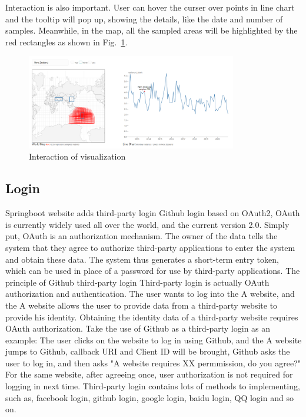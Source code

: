 \documentclass[conference]{IEEEtran}
\begin{document}
Interaction is also important. User can hover the curser over points in line chart and the tooltip will pop up, showing the details, like the date and number of samples. Meanwhile, in the map, all the sampled areas will be highlighted by the red rectangles as shown in Fig.~\ref{iov}.

\begin{figure}[htbp]
    \centerline{\includegraphics[width=260pt]{images/Interaction_of_visualization.png}}
    \caption{Interaction of visualization}
    \label{iov}
\end{figure}

\subsection{Login}
Springboot website adds third-party login Github login based on OAuth2, OAuth is currently widely used all over the world, and the current version 2.0. Simply put,
OAuth is an authorization mechanism. The owner of the data tells the system that they agree to authorize
third-party applications to enter the system and obtain these data. The system thus generates a short-term
entry token, which can be used in place of a password for use by third-party applications. The principle of Github third-party login
Third-party login is actually OAuth authorization and authentication. The user wants to log into the
A website, and the A website allows the user to provide data from a third-party website to provide his
identity. Obtaining the identity data of a third-party website requires OAuth authorization.
Take the use of Github as a third-party login as an example: The user clicks on the website to log in using Github, and the A website jumps to Github, callback
URI and Client ID will be brought, Github asks the user to log in, and then asks "A website requires XX permmission, do you agree?"
For the same website, after agreeing once, user authorization is not required for logging in next time. Third-party login contains
lots of methods to implementing, such as, facebook login, github login, google login,
baidu login, QQ login and so on.
\end{document}
